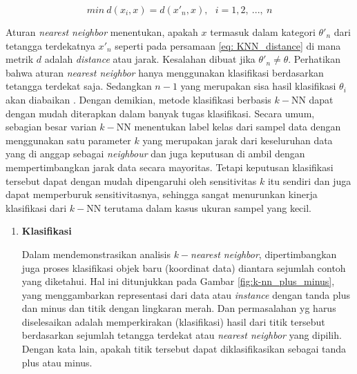 \begin{subs}
	\begin{equation}\label{eq: KNN_distance}
	min\ d(x_{i}, x) = d(x'_{n}, x),\ \ \ i = 1, 2,\ ...,\ n
	\end{equation}
	
	Aturan \textit{nearest neighbor} menentukan, apakah $x$ termasuk dalam kategori $\theta'_{n}$ dari tetangga terdekatnya $x'_{n}$ seperti pada persamaan \ref{eq: KNN_distance} di mana metrik $d$ adalah \textit{distance} atau jarak. Kesalahan dibuat jika $\theta'_{n} \neq \theta$. Perhatikan bahwa aturan \textit{nearest neighbor} hanya menggunakan klasifikasi berdasarkan tetangga terdekat saja. Sedangkan $n - 1$ yang merupakan sisa hasil klasifikasi $\theta_{i}$ akan diabaikan \citep{Cover1967}. Dengan demikian, metode klasifikasi berbasis $k-$NN dapat dengan mudah diterapkan dalam banyak tugas klasifikasi. Secara umum, sebagian besar varian $k-$NN menentukan label kelas dari sampel data dengan menggunakan satu parameter $k$ yang merupakan jarak dari keseluruhan data yang di anggap sebagai \textit{neighbour} dan juga keputusan di ambil dengan mempertimbangkan jarak data secara mayoritas. Tetapi keputusan klasifikasi tersebut dapat dengan mudah dipengaruhi oleh sensitivitas $k$ itu sendiri dan juga dapat memperburuk sensitivitasnya, sehingga sangat menurunkan kinerja klasifikasi dari $k-$NN terutama dalam kasus ukuran sampel yang kecil.
	
	\begin{enumerate}[label=\textbf{\alph*).}]
		
		\item \textbf{Klasifikasi}
		\setlength{\parindent}{0.8cm}
		
		Dalam mendemonstrasikan analisis $k-$\textit{nearest neighbor}, dipertimbangkan juga proses klasifikasi objek baru (koordinat data) diantara sejumlah contoh yang diketahui. Hal ini ditunjukkan pada Gambar \ref{fig:k-nn_plus_minus}, yang menggambarkan representasi dari data atau \textit{instance} dengan tanda plus dan minus dan titik dengan lingkaran merah. Dan permasalahan yg harus diselesaikan adalah memperkirakan (klasifikasi) hasil dari titik tersebut berdasarkan sejumlah tetangga terdekat atau \textit{nearest neighbor} yang dipilih. Dengan kata lain, apakah titik tersebut dapat diklasifikasikan sebagai tanda plus atau minus.
		

\end{enumerate}
\end{subs}
